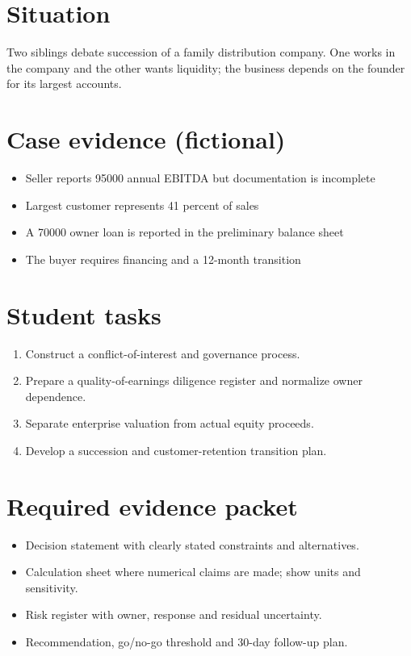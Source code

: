 \documentclass[11pt]{article}
\begin{document}
\SuiteOpen
\section{Situation}
Two siblings debate succession of a family distribution company. One works in the company and the other wants liquidity; the business depends on the founder for its largest accounts.
\section{Case evidence (fictional)}
\begin{itemize}[leftmargin=*,itemsep=3pt]
\item Seller reports 95000 annual EBITDA but documentation is incomplete
\item Largest customer represents 41 percent of sales
\item A 70000 owner loan is reported in the preliminary balance sheet
\item The buyer requires financing and a 12-month transition
\end{itemize}

\section{Student tasks}
\begin{enumerate}[leftmargin=*,itemsep=5pt]
\item Construct a conflict-of-interest and governance process.
\item Prepare a quality-of-earnings diligence register and normalize owner dependence.
\item Separate enterprise valuation from actual equity proceeds.
\item Develop a succession and customer-retention transition plan.
\end{enumerate}

\section{Required evidence packet}
\begin{itemize}[leftmargin=*,itemsep=3pt]
\item Decision statement with clearly stated constraints and alternatives.
\item Calculation sheet where numerical claims are made; show units and sensitivity.
\item Risk register with owner, response and residual uncertainty.
\item Recommendation, go/no-go threshold and 30-day follow-up plan.
\end{itemize}
\end{document}
